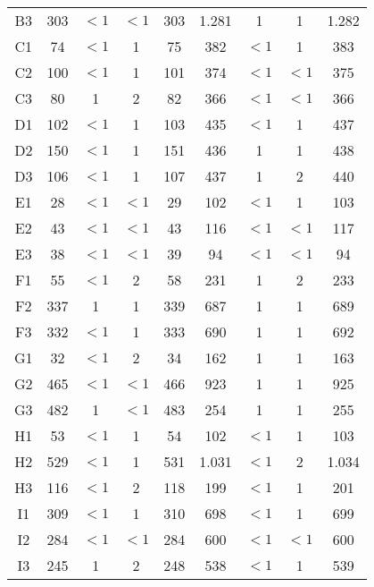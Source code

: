 \begin{center}
\begin{longtable}{ccccc|cccc}
    B3    & 303   & $<1$     & $<1$     & 303   & 1.281 & 1     & 1     & 1.282 \\
    C1    & 74    & $<1$     & 1     & 75    & 382   & $<1$     & 1     & 383 \\
    C2    & 100   & $<1$     & 1     & 101   & 374   & $<1$     & $<1$     & 375 \\
    C3    & 80    & 1     & 2     & 82    & 366   & $<1$     & $<1$     & 366 \\
    D1    & 102   & $<1$     & 1     & 103   & 435   & $<1$     & 1     & 437 \\
    D2    & 150   & $<1$     & 1     & 151   & 436   & 1     & 1     & 438 \\
    D3    & 106   & $<1$     & 1     & 107   & 437   & 1     & 2     & 440 \\
    E1    & 28    & $<1$     & $<1$     & 29    & 102   & $<1$     & 1     & 103 \\
    E2    & 43    & $<1$     & $<1$     & 43    & 116   & $<1$     & $<1$     & 117 \\
    E3    & 38    & $<1$     & $<1$     & 39    & 94    & $<1$     & $<1$     & 94 \\
    F1    & 55    & $<1$     & 2     & 58    & 231   & 1     & 2     & 233 \\
    F2    & 337   & 1     & 1     & 339   & 687   & 1     & 1     & 689 \\
    F3    & 332   & $<1$     & 1     & 333   & 690   & 1     & 1     & 692 \\
    G1    & 32    & $<1$     & 2     & 34    & 162   & 1     & 1     & 163 \\
    G2    & 465   & $<1$     & $<1$     & 466   & 923   & 1     & 1     & 925 \\
    G3    & 482   & 1     & $<1$     & 483   & 254   & 1     & 1     & 255 \\
    H1    & 53    & $<1$     & 1     & 54    & 102   & $<1$     & 1     & 103 \\
    H2    & 529   & $<1$     & 1     & 531   & 1.031 & $<1$     & 2     & 1.034 \\
    H3    & 116   & $<1$     & 2     & 118   & 199   & $<1$     & 1     & 201 \\
    I1    & 309   & $<1$     & 1     & 310   & 698   & $<1$     & 1     & 699 \\
    I2    & 284   & $<1$     & $<1$     & 284   & 600   & $<1$     & $<1$     & 600 \\
    I3    & 245   & 1     & 2     & 248   & 538   & $<1$     & 1     & 539 \\

\end{longtable}
\end{center}
